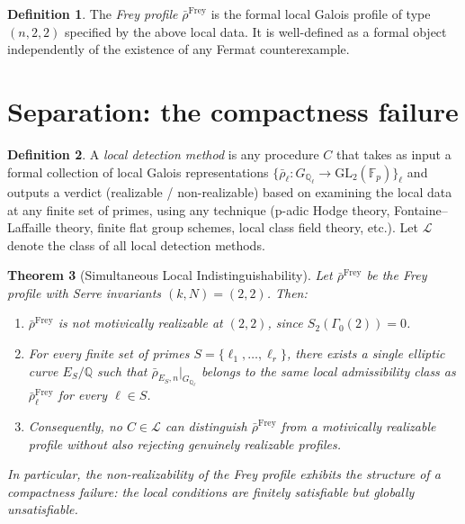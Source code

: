 \documentclass[12pt]{amsart}
\newtheorem{theorem}{Theorem}[section]
\theoremstyle{definition}
\newtheorem{definition}[theorem]{Definition}
\theoremstyle{remark}
\newcommand{\GL}{\mathrm{GL}}
\newcommand{\rhobar}{\bar{\rho}}
\newcommand{\Fp}{\mathbb{F}_p}
\newcommand{\GQl}{G_{\mathbb{Q}_\ell}}
\begin{document}
\begin{definition}\label{def:frey-profile}
The \emph{Frey profile} $\rhobar^{\mathrm{Frey}}$ is the formal local Galois profile of type $(n, 2, 2)$ specified by the above local data. It is well-defined as a formal object independently of the existence of any Fermat counterexample.
\end{definition}

\section{Separation: the compactness failure}
\label{sec:separation}

\begin{definition}
A \emph{local detection method} is any procedure $C$ that takes as input a formal collection of local Galois representations $\{\rhobar_\ell : \GQl \to \GL_2(\Fp)\}_\ell$ and outputs a verdict (realizable / non-realizable) based on examining the local data at any finite set of primes, using any technique (p-adic Hodge theory, Fontaine--Laffaille theory, finite flat group schemes, local class field theory, etc.). Let $\mathcal{L}$ denote the class of all local detection methods.
\end{definition}

\begin{theorem}[Simultaneous Local Indistinguishability]\label{thm:separation}
Let\/ $\rhobar^{\mathrm{Frey}}$ be the Frey profile with Serre invariants $(k, N) = (2, 2)$. Then:
\begin{enumerate}[label=(\roman*)]
\item $\rhobar^{\mathrm{Frey}}$ is not motivically realizable at $(2, 2)$, since $S_2(\Gamma_0(2)) = 0$.
\item For every finite set of primes $S = \{\ell_1, \ldots, \ell_r\}$, there exists a single elliptic curve $E_S / \mathbb{Q}$ such that $\rhobar_{E_S, n}|_{\GQl}$ belongs to the same local admissibility class as $\rhobar^{\mathrm{Frey}}_\ell$ for every $\ell \in S$.
\item Consequently, no $C \in \mathcal{L}$ can distinguish $\rhobar^{\mathrm{Frey}}$ from a motivically realizable profile without also rejecting genuinely realizable profiles.
\end{enumerate}
In particular, the non-realizability of the Frey profile exhibits the structure of a \emph{compactness failure}: the local conditions are finitely satisfiable but globally unsatisfiable.
\end{theorem}
\end{document}
